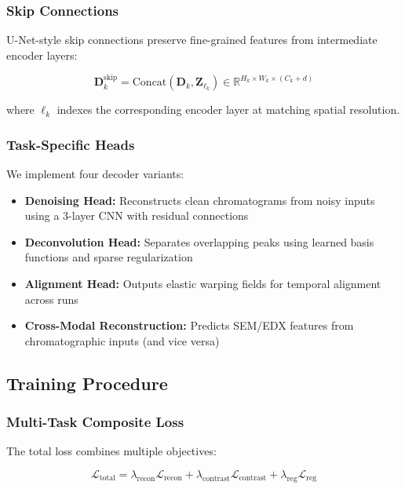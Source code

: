 \documentclass[12pt,a4paper]{article}
\begin{document}
\subsubsection{Skip Connections}

U-Net-style skip connections preserve fine-grained features from intermediate encoder layers:

\begin{equation}
\mathbf{D}_k^{\text{skip}} = \text{Concat}(\mathbf{D}_k, \mathbf{Z}_{\ell_k}) \in \mathbb{R}^{H_k \times W_k \times (C_k + d)}
\end{equation}

where $\ell_k$ indexes the corresponding encoder layer at matching spatial resolution.

\subsubsection{Task-Specific Heads}

We implement four decoder variants:

\begin{itemize}
    \item \textbf{Denoising Head:} Reconstructs clean chromatograms from noisy inputs using a 3-layer CNN with residual connections
    \item \textbf{Deconvolution Head:} Separates overlapping peaks using learned basis functions and sparse regularization
    \item \textbf{Alignment Head:} Outputs elastic warping fields for temporal alignment across runs
    \item \textbf{Cross-Modal Reconstruction:} Predicts SEM/EDX features from chromatographic inputs (and vice versa)
\end{itemize}

\subsection{Training Procedure}

\subsubsection{Multi-Task Composite Loss}

The total loss combines multiple objectives:

\begin{equation}
\mathcal{L}_{\text{total}} = \lambda_{\text{recon}} \mathcal{L}_{\text{recon}} + \lambda_{\text{contrast}} \mathcal{L}_{\text{contrast}} + \lambda_{\text{reg}} \mathcal{L}_{\text{reg}}
\end{equation}
\end{document}
